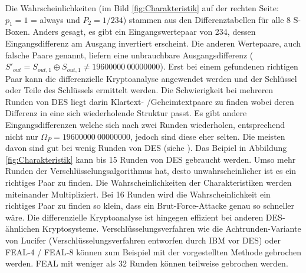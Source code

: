 Die Wahrscheinlichkeiten (im Bild \ref{fig:Charakteristik} auf der rechten Seite: $p_{1} = 1$ = always und $P_{2} = 1/234$) stammen aus den Differenztabellen für alle 8 S-Boxen. Anders gesagt, es gibt ein Eingangswertepaar von 234, dessen Eingangsdifferenz am Ausgang invertiert erscheint. Die anderen Wertepaare, auch \glqq falsche Paare\grqq{} genannt, liefern eine unbrauchbare Ausgangsdifferenz ($S'_{out} = S_{out,1} \oplus S_{out,1} \neq  19600000\ 00000000$). Erst bei einem gefundenen \glqq richtigen Paar\grqq{} kann die differenzielle Kryptoanalyse angewendet werden und der Schlüssel oder Teile des Schlüssels ermittelt werden.
Die Schwierigkeit bei mehreren Runden von DES liegt darin Klartext- /Geheimtextpaare zu finden wobei deren Differenz in eine sich wiederholende Struktur passt.
Es gibt andere Eingangsdifferenzen welche sich nach zwei Runden wiederholen, entsprechend nicht nur $\Omega_{P} = 19600000\ 00000000$,  jedoch sind diese eher selten. Die meisten davon sind gut bei wenig Runden von DES (siehe \cite{biham_differential_1990}).
Das Beipiel in Abbildung \ref{fig:Charakteristik} kann bis 15 Runden von DES gebraucht werden. 
Umso mehr Runden der Verschlüsselungsalgorithmus hat, desto unwahrscheinlicher ist es ein richtiges Paar zu finden. Die Wahrscheinlichkeiten der Charakteristiken werden miteinander Multipliziert.
Bei 16 Runden wird die Wahrscheinlichkeit ein richtiges Paar zu finden so klein, dass ein Brut-Force-Attacke genau so schneller wäre.
Die differenzielle Kryptoanalyse ist hingegen effizient bei anderen DES-ähnlichen Kryptosysteme. Verschlüsselungsverfahren wie die Achtrunden-Variante von Lucifer (Verschlüsselungsverfahren entworfen durch IBM vor DES) oder FEAL-4 / FEAL-8 können zum Beispiel mit der vorgestellten Methode gebrochen werden. FEAL mit weniger als 32 Runden können teilweise gebrochen werden. \cite{biham_differential_1990}













